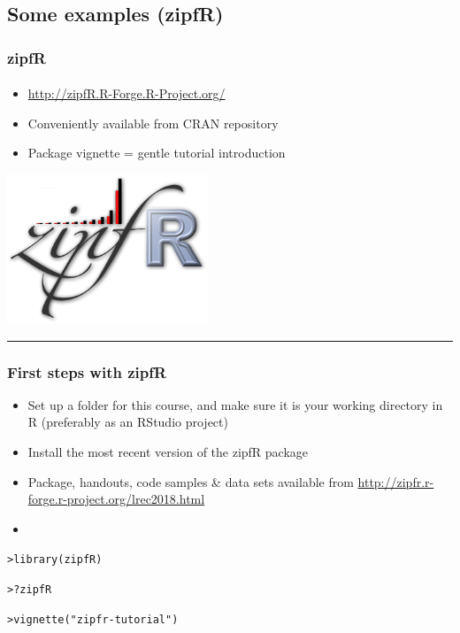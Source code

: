 \documentclass[t]{beamer} %
\begin{document}
\subsection{Some examples (zipfR)}

\begin{frame}
  \frametitle{zipfR}
  \framesubtitle{\citet{Evert:Baroni:07}}

  \begin{itemize}
  \item \url{http://zipfR.R-Forge.R-Project.org/}
  \item Conveniently available from CRAN repository
  \item Package vignette = gentle tutorial introduction
  \end{itemize}

  \begin{flushright}
    \includegraphics[width=6cm]{img/zipfR_logo}
    \rule{1cm}{0mm}
  \end{flushright}

\end{frame}

\begin{frame}[fragile]
  \frametitle{First steps with zipfR}

  \begin{itemize}
  \item Set up a folder for this course, and make sure it is your working directory in R (preferably as an RStudio project)
  \item Install the most recent version of the zipfR package
  \item Package, handouts, code samples \& data sets available from \url{http://zipfr.r-forge.r-project.org/lrec2018.html}
  \item[]
  \end{itemize}
  
\begin{alltt}
> library(zipfR)

> ?zipfR  

> vignette("zipfr-tutorial")  
\end{alltt} 
\end{frame}
\end{document}
